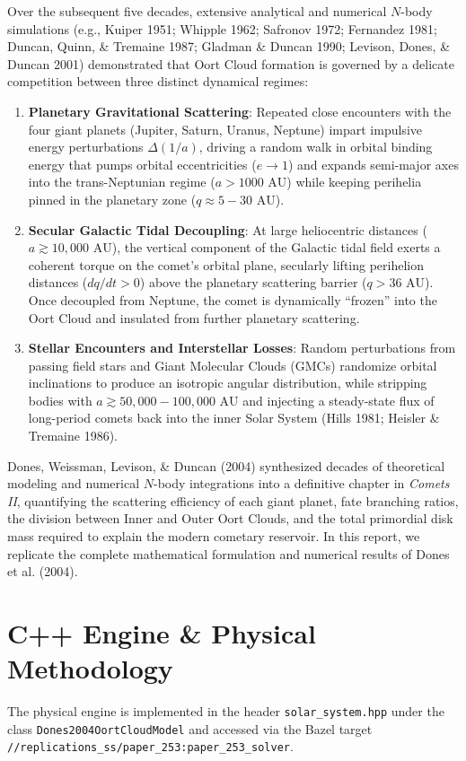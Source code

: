 \documentclass[11pt,a4paper]{article}
\begin{document}
Over the subsequent five decades, extensive analytical and numerical $N$-body simulations (e.g., Kuiper 1951; Whipple 1962; Safronov 1972; Fernandez 1981; Duncan, Quinn, \& Tremaine 1987; Gladman \& Duncan 1990; Levison, Dones, \& Duncan 2001) demonstrated that Oort Cloud formation is governed by a delicate competition between three distinct dynamical regimes:
\begin{enumerate}
    \item \textbf{Planetary Gravitational Scattering}: Repeated close encounters with the four giant planets (Jupiter, Saturn, Uranus, Neptune) impart impulsive energy perturbations $\Delta(1/a)$, driving a random walk in orbital binding energy that pumps orbital eccentricities ($e \to 1$) and expands semi-major axes into the trans-Neptunian regime ($a > 1000\text{ AU}$) while keeping perihelia pinned in the planetary zone ($q \approx 5 - 30\text{ AU}$).
    \item \textbf{Secular Galactic Tidal Decoupling}: At large heliocentric distances ($a \gtrsim 10,000\text{ AU}$), the vertical component of the Galactic tidal field exerts a coherent torque on the comet's orbital plane, secularly lifting perihelion distances ($dq/dt > 0$) above the planetary scattering barrier ($q > 36\text{ AU}$). Once decoupled from Neptune, the comet is dynamically ``frozen'' into the Oort Cloud and insulated from further planetary scattering.
    \item \textbf{Stellar Encounters and Interstellar Losses}: Random perturbations from passing field stars and Giant Molecular Clouds (GMCs) randomize orbital inclinations to produce an isotropic angular distribution, while stripping bodies with $a \gtrsim 50,000 - 100,000\text{ AU}$ and injecting a steady-state flux of long-period comets back into the inner Solar System (Hills 1981; Heisler \& Tremaine 1986).
\end{enumerate}

Dones, Weissman, Levison, \& Duncan (2004) synthesized decades of theoretical modeling and numerical $N$-body integrations into a definitive chapter in \textit{Comets II}, quantifying the scattering efficiency of each giant planet, fate branching ratios, the division between Inner and Outer Oort Clouds, and the total primordial disk mass required to explain the modern cometary reservoir. In this report, we replicate the complete mathematical formulation and numerical results of Dones et al. (2004).

\section{C++ Engine \& Physical Methodology}
The physical engine is implemented in the header \texttt{solar\_system.hpp} under the class \texttt{Dones2004OortCloudModel} and accessed via the Bazel target \texttt{//replications\_ss/paper\_253:paper\_253\_solver}.
\end{document}
